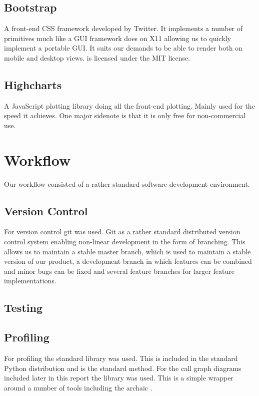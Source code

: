 \documentclass[a4paper, openany, oneside]{memoir}
\begin{document}
\subsection{Bootstrap}
\label{sec:bootstrap}
A front-end CSS framework developed by Twitter. It implements a number of primitives much like a GUI framework does on X11 allowing us to quickly implement a portable GUI. It suits our demands to be able to render both on mobile and desktop views.  is licensed under the MIT license.

\subsection{Highcharts}
\label{sec:highcharts}
A JavaScript plotting library doing all the front-end plotting. Mainly used for the speed it achieves. One major sidenote is that it is only free for non-commercial use.

\section{Workflow}
\label{sec:workflow}
Our workflow consisted of a rather standard software development environment.

\subsection{Version Control}
\label{sec:version-control}
For version control git was used. Git as a rather standard distributed version control system enabling non-linear development in the form of branching. This allows us to maintain a stable master branch, which is used to maintain a stable version of our product, a development branch in which features can be combined and minor bugs can be fixed and several feature branches for larger feature implementations.

\subsection{Testing}
\label{sec:testing}


\subsection{Profiling}
\label{sec:profiling}
For profiling the standard  library was used. This is included in the standard Python distribution and is the standard method. For the call graph diagrams included later in this report the library  was used. This is a simple wrapper around a number of tools including the archaic .
\end{document}
